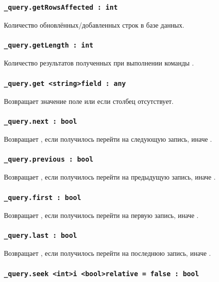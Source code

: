 \subsubsection{\lstinline|_query.getRowsAffected : int|}

Количество обновлённых/добавленных строк в базе данных.

\subsubsection{\lstinline|_query.getLength : int|}

Количество результатов полученных при выполнении команды .

\subsubsection{\lstinline|_query.get <string>field : any|}

Возвращает значение поле или \void{} если столбец  отсутствует.

\subsubsection{\lstinline|_query.next : bool|}

Возвращает \true, если получилось перейти на следующую запись, иначе \false.

\subsubsection{\lstinline|_query.previous : bool|}

Возвращает \true, если получилось перейти на предыдущую запись, иначе \false.

\subsubsection{\lstinline|_query.first : bool|}

Возвращает \true, если получилось перейти на первую запись, иначе \false.

\subsubsection{\lstinline|_query.last : bool|}

Возвращает \true, если получилось перейти на последнюю запись, иначе \false.

\subsubsection{\lstinline|_query.seek <int>i <bool>relative = false : bool|}


